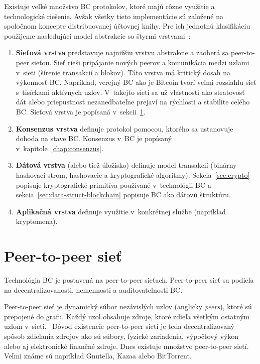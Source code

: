 Existuje veľké množstvo BC protokolov, ktoré majú rôzne využitie a technologické riešenie. Avšak všetky tieto implementácie sú založené na spoločnom koncepte distribuovanej účtovnej knihy. Pre ich jednotnú klasifikáciu použijeme nasledujúci model abstrakcie so štyrmi vrstvami~\cite{homoliakBlockchain}:

\begin{enumerate}
	\item \textbf{Sieťová vrstva} predstavuje najnižšiu vrstvu abstrakcie a zaoberá sa peer-to-peer sieťou. Sieť rieši pripájanie nových peerov a komunikácia medzi uzlami v~sieti (šírenie transakcií a blokov). Táto vrstva má kritický dosah na výkonnosť BC. Napríklad, verejný BC ako je Bitcoin tvorí veľmi rozsiahlu sieť s~tisíckami aktívnych uzlov. V~takejto sieti sa už vlastnosti ako stratovosť dát alebo priepustnosť nezanedbateľne prejaví na rýchlosti a stabilite celého BC. Sieťová vrstva je popísaná v~sekcii~\ref{sec:p2p}.~\cite{fanPerfEval}
	\item \textbf{Konsenzus vrstva} definuje protokol pomocou, ktorého sa ustanovuje dohoda na stave BC. Konsenzus v~BC je popísaný v~kapitole~\ref{chap:consenzus}.
	\item \textbf{Dátová vrstva} (alebo tiež úložisko) definuje model transakcií (binárny hashovací strom, hashovacie a kryptografické algoritmy). Sekcia~\ref{sec:crypto} popisuje kryptografické primitíva používané v~technológii BC a sekcia~\ref{sec:data-struct-blockchain} popisuje BC ako dátovú štruktúru.
	\item \textbf{Aplikačná vrstva} definuje využitie v~konkrétnej službe (napríklad kryptomena).
\end{enumerate}

\section{Peer-to-peer sieť}\label{sec:p2p}

Technológia BC je postavená na peer-to-peer sieťach. Peer-to-peer sieť sa podieľa na decentralizovanosti, nemennosti a auditovateľnosti BC. 

Peer-to-peer sieť je dynamický súbor nezávislých uzlov (anglicky \textit{peers}), ktoré sú prepojené do grafu. Každý uzol obsahuje zdroje, ktoré zdieľa všetkým ostatným uzlom v~sieti.~\cite{p2pBuford, p2pSchollmeier} Dôvod existencie peer-to-peer sietí je teda decentralizovaný spôsob zdieľania zdrojov ako sú súbory, fyzické zariadenia, výpočtový výkon alebo aj elektronické finančné zdroje. Dnes existuje množstvo peer-to-peer sietí. Veľmi známe sú napríklad Gnutella, Kazaa alebo BitTorrent.~\cite{p2pEssence}

